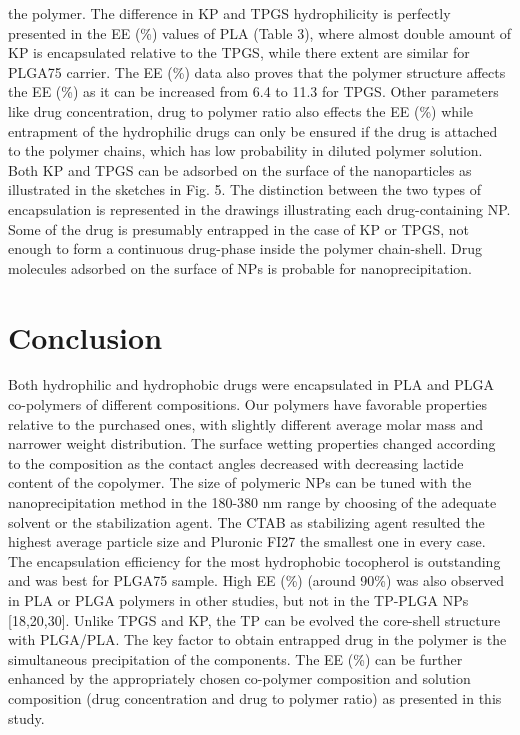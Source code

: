 \documentclass[11pt,letterpaper]{article}
\begin{document}
	the polymer. The difference in KP and TPGS hydrophilicity is perfectly
	presented in the EE (\%) values of PLA (Table 3), where almost double
	amount of KP is encapsulated relative to the TPGS, while there extent
	are similar for PLGA75 carrier. The EE (\%) data also proves that the
	polymer structure affects the EE (\%) as it can be increased from 6.4 to
	11.3 for TPGS. Other parameters like drug concentration, drug to
	polymer ratio also effects the EE (\%) while entrapment of the hydrophilic drugs can only be ensured if the drug is attached to the polymer
	chains, which has low probability in diluted polymer solution. Both KP
	and TPGS can be adsorbed on the surface of the nanoparticles as illustrated in the sketches in Fig. 5.
	The distinction between the two types of encapsulation is represented in the drawings illustrating each drug-containing NP. Some of
	the drug is presumably entrapped in the case of KP or TPGS, not enough
	to form a continuous drug-phase inside the polymer chain-shell. Drug
	molecules adsorbed on the surface of NPs is probable for nanoprecipitation.
	
	\section{Conclusion}
	
	Both hydrophilic and hydrophobic drugs were encapsulated in PLA
	and PLGA co-polymers of different compositions. Our polymers have
	favorable properties relative to the purchased ones, with slightly different average molar mass and narrower weight distribution. The surface wetting properties changed according to the composition as the
	contact angles decreased with decreasing lactide content of the copolymer. The size of polymeric NPs can be tuned with the nanoprecipitation method in the 180-380 nm range by choosing of the adequate
	solvent or the stabilization agent. The CTAB as stabilizing agent resulted the highest average particle size and Pluronic FI27 the smallest
	one in every case. The encapsulation efficiency for the most hydrophobic tocopherol is outstanding and was best for PLGA75 sample.
	High EE (\%) (around 90\%) was also observed in PLA or PLGA polymers
	in other studies, but not in the TP-PLGA NPs [18,20,30]. Unlike TPGS
	and KP, the TP can be evolved the core-shell structure with PLGA/PLA.
	The key factor to obtain entrapped drug in the polymer is the simultaneous precipitation of the components. The EE (\%) can be further
	enhanced by the appropriately chosen co-polymer composition and
	solution composition (drug concentration and drug to polymer ratio) as
	presented in this study.
	
	
\end{document}
